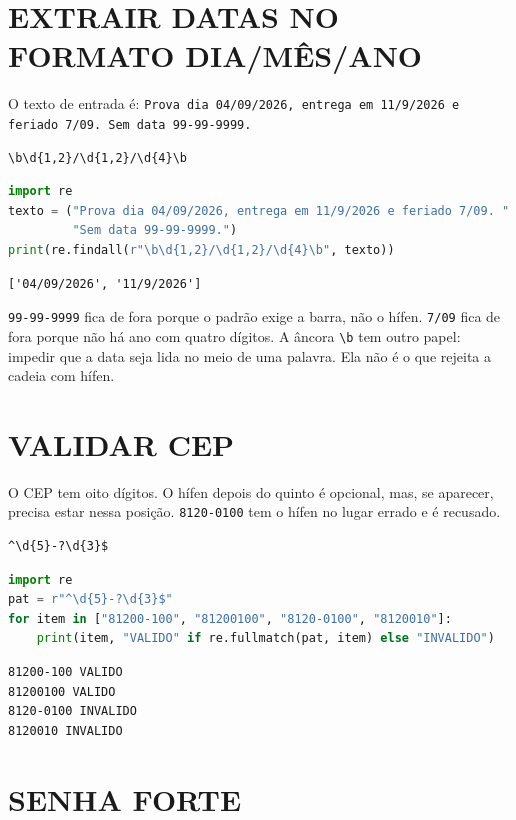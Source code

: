 \documentclass[
    12pt,
    oneside,
    a4paper,
    chapter=TITLE,
    section=TITLE,
    sumario=abnt-6027-2012
]{abntex2}
\begin{document}
\section{EXTRAIR DATAS NO FORMATO DIA/MÊS/ANO}

O texto de entrada é: \texttt{Prova dia 04/09/2026, entrega em 11/9/2026 e feriado 7/09. Sem data 99-99-9999.}

\begin{lstlisting}
\b\d{1,2}/\d{1,2}/\d{4}\b
\end{lstlisting}

\begin{lstlisting}[language=Python]
import re
texto = ("Prova dia 04/09/2026, entrega em 11/9/2026 e feriado 7/09. "
         "Sem data 99-99-9999.")
print(re.findall(r"\b\d{1,2}/\d{1,2}/\d{4}\b", texto))
\end{lstlisting}

\begin{lstlisting}
['04/09/2026', '11/9/2026']
\end{lstlisting}

\texttt{99-99-9999} fica de fora porque o padrão exige a barra, não o hífen. \texttt{7/09} fica de fora porque não há ano com quatro dígitos. A âncora \verb|\b| tem outro papel: impedir que a data seja lida no meio de uma palavra. Ela não é o que rejeita a cadeia com hífen.

\section{VALIDAR CEP}

O CEP tem oito dígitos. O hífen depois do quinto é opcional, mas, se aparecer, precisa estar nessa posição. \texttt{8120-0100} tem o hífen no lugar errado e é recusado.

\begin{lstlisting}
^\d{5}-?\d{3}$
\end{lstlisting}

\begin{lstlisting}[language=Python]
import re
pat = r"^\d{5}-?\d{3}$"
for item in ["81200-100", "81200100", "8120-0100", "8120010"]:
    print(item, "VALIDO" if re.fullmatch(pat, item) else "INVALIDO")
\end{lstlisting}

\begin{lstlisting}
81200-100 VALIDO
81200100 VALIDO
8120-0100 INVALIDO
8120010 INVALIDO
\end{lstlisting}

\section{SENHA FORTE}
\end{document}

